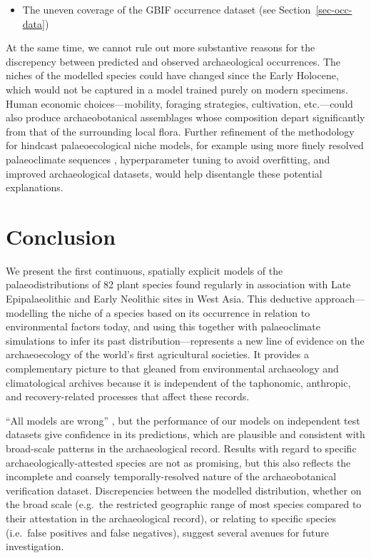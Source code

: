 \documentclass[
  authoryear,
  preprint]{elsarticle}
\providecommand{\tightlist}{%
  \setlength{\itemsep}{0pt}\setlength{\parskip}{0pt}}\usepackage{longtable,booktabs,array}
\begin{document}
\begin{itemize}
\tightlist
\item
  The uneven coverage of the GBIF occurrence dataset (see
  Section~\ref{sec-occ-data})
\end{itemize}

At the same time, we cannot rule out more substantive reasons for the
discrepency between predicted and observed archaeological occurrences.
The niches of the modelled species could have changed since the Early
Holocene, which would not be captured in a model trained purely on
modern specimens. Human economic choices---mobility, foraging
strategies, cultivation, etc.---could also produce archaeobotanical
assemblages whose composition depart significantly from that of the
surrounding local flora. Further refinement of the methodology for
hindcast palaeoecological niche models, for example using more finely
resolved palaeoclimate sequences \citep[e.g.][]{KargerEtAl2023},
hyperparameter tuning to avoid overfitting, and improved archaeological
datasets, would help disentangle these potential explanations.

\section{Conclusion}\label{conclusion}

We present the first continuous, spatially explicit models of the
palaeodistributions of 82 plant species found regularly in association
with Late Epipalaeolithic and Early Neolithic sites in West Asia. This
deductive approach---modelling the niche of a species based on its
occurrence in relation to environmental factors today, and using this
together with palaeoclimate simulations to infer its past
distribution---represents a new line of evidence on the archaeoecology
of the world's first agricultural societies. It provides a complementary
picture to that gleaned from environmental archaeology and
climatological archives because it is independent of the taphonomic,
anthropic, and recovery-related processes that affect these records.

``All models are wrong'' \citep{Box1976}, but the performance of our
models on independent test datasets give confidence in its predictions,
which are plausible and consistent with broad-scale patterns in the
archaeological record. Results with regard to specific
archaeologically-attested species are not as promising, but this also
reflects the incomplete and coarsely temporally-resolved nature of the
archaeobotanical verification dataset. Discrepencies between the
modelled distribution, whether on the broad scale (e.g.~the restricted
geographic range of most species compared to their attestation in the
archaeological record), or relating to specific species (i.e.~false
positives and false negatives), suggest several avenues for future
investigation.
\end{document}
